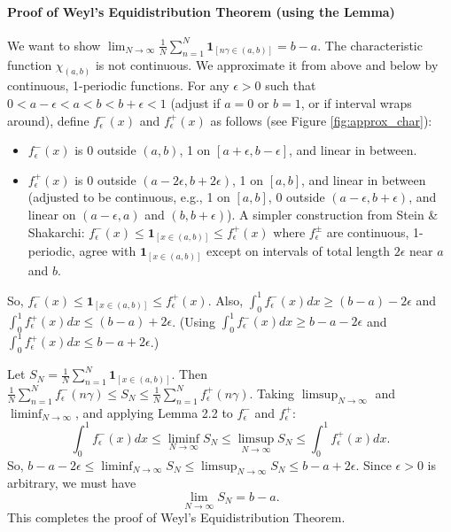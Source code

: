 \documentclass[12pt]{article}
\begin{document}
\paragraph{Proof of Weyl's Equidistribution Theorem (using the Lemma)}
We want to show $\lim_{N\to\infty} \frac{1}{N} \sum_{n=1}^N \mathbf{1}_{[n\gamma \in (a,b)]} = b-a$.
The characteristic function $\chi_{(a,b)}$ is not continuous. We approximate it from above and below by continuous, 1-periodic functions.
For any $\epsilon > 0$ such that $0 < a-\epsilon < a < b < b+\epsilon < 1$ (adjust if $a=0$ or $b=1$, or if interval wraps around), define $f_\epsilon^-(x)$ and $f_\epsilon^+(x)$ as follows (see Figure \ref{fig:approx_char}):
\begin{itemize}
    \item $f_\epsilon^-(x)$ is 0 outside $(a,b)$, 1 on $[a+\epsilon, b-\epsilon]$, and linear in between.
    \item $f_\epsilon^+(x)$ is 0 outside $(a-2\epsilon, b+2\epsilon)$, 1 on $[a,b]$, and linear in between (adjusted to be continuous, e.g., 1 on $[a,b]$, 0 outside $(a-\epsilon, b+\epsilon)$, and linear on $(a-\epsilon,a)$ and $(b, b+\epsilon)$). A simpler construction from Stein & Shakarchi: $f_\epsilon^-(x) \le \mathbf{1}_{[x \in (a,b)]} \le f_\epsilon^+(x)$ where $f_\epsilon^\pm$ are continuous, 1-periodic, agree with $\mathbf{1}_{[x \in (a,b)]}$ except on intervals of total length $2\epsilon$ near $a$ and $b$.
\end{itemize}
So, $f_\epsilon^-(x) \le \mathbf{1}_{[x \in (a,b)]} \le f_\epsilon^+(x)$.
Also, $\int_0^1 f_\epsilon^-(x) dx \ge (b-a) - 2\epsilon$ and $\int_0^1 f_\epsilon^+(x) dx \le (b-a) + 2\epsilon$.
(Using $\int_0^1 f_\epsilon^-(x) dx \ge b-a-2\epsilon$ and $\int_0^1 f_\epsilon^+(x) dx \le b-a+2\epsilon$.)

Let $S_N = \frac{1}{N} \sum_{n=1}^N \mathbf{1}_{[x \in (a,b)]}$.
Then $\frac{1}{N} \sum_{n=1}^N f_\epsilon^-(n\gamma) \le S_N \le \frac{1}{N} \sum_{n=1}^N f_\epsilon^+(n\gamma)$.
Taking $\limsup_{N\to\infty}$ and $\liminf_{N\to\infty}$, and applying Lemma 2.2 to $f_\epsilon^-$ and $f_\epsilon^+$:
$$ \int_0^1 f_\epsilon^-(x) dx \le \liminf_{N\to\infty} S_N \le \limsup_{N\to\infty} S_N \le \int_0^1 f_\epsilon^+(x) dx. $$
So, $b-a-2\epsilon \le \liminf_{N\to\infty} S_N \le \limsup_{N\to\infty} S_N \le b-a+2\epsilon$.
Since $\epsilon > 0$ is arbitrary, we must have
$$ \lim_{N\to\infty} S_N = b-a. $$
This completes the proof of Weyl's Equidistribution Theorem.
\end{document}
